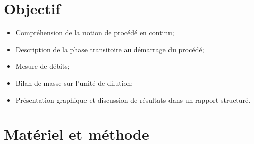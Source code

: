 \documentclass[a4paper,11pt, french]{article}
\begin{document}
\clearpage
{}
\newpage

\thispagestyle{empty}



\section{Objectif}
\begin{itemize}
	\item Compréhension de la notion de procédé en continu;
	\item Description de la phase transitoire au démarrage du procédé;
	\item Mesure de débits;
	\item Bilan de masse sur l'unité de dilution;
	\item Présentation graphique et discussion de résultats dans un rapport structuré.
\end{itemize}

\section{Matériel et méthode}
\end{document}
